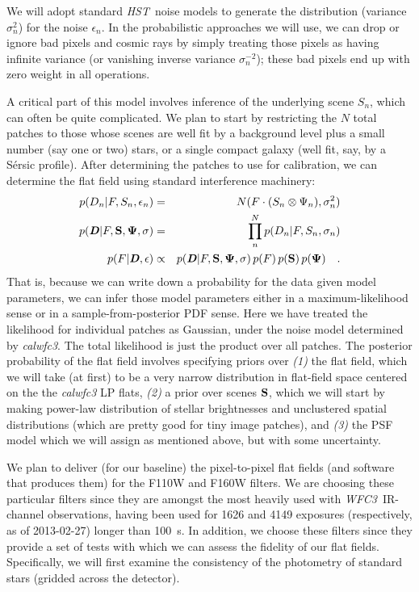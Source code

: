 \documentclass[12pt]{article}
\newcommand{\project}[1]{\textsl{#1}}
\newcommand{\HST}{\project{HST}}
\newcommand{\WFC}{\project{WFC3}}
\newcommand{\bvec}[1]{\textbf{\textit{#1}}}
\begin{document}
We will adopt standard \HST\ noise models to generate the distribution
(variance $\sigma_n^2$) for the noise $\epsilon_n$.  In the
probabilistic approaches we will use, we can drop or ignore bad pixels
and cosmic rays by simply treating those pixels as having infinite
variance (or vanishing inverse variance $\sigma_n^{-2}$); these bad
pixels end up with zero weight in all operations.

A critical part of this model involves inference of the underlying
scene $S_n$, which can often be quite complicated.  We plan to start by restricting the $N$ total patches to those whose
scenes are well fit by a background level plus a small number (say one or two) stars, or a single compact
galaxy (well fit, say, by a S\'{e}rsic profile).  After determining
the patches to use for calibration, we can determine the flat field
using standard interference machinery:
\begin{eqnarray}
p(D_n|F,S_n,\epsilon_n) &=& N(F \cdot (S_n \otimes \Psi_n), \sigma_n^2)
\\
p(\bvec{D}|F,{\bf S},{\bf \Psi},{\bf \sigma}) &=& \prod_n^N
p(D_n|F,S_n,\sigma_n) \\
p(F|\bvec{D},{\bf \epsilon}) & \propto & p(\bvec{D}|F,{\bf S},{\bf \Psi},{\bf
  \sigma})\, p(F)\, p({\bf S})\, p({\bf \Psi})
\quad .
\end{eqnarray}
That is, because we can write down a probability for the data given model
parameters, we can infer those model parameters either in a maximum-likelihood
sense or in a sample-from-posterior PDF sense.
Here we have treated the likelihood for individual patches as
Gaussian, under the noise model determined by \textsl{calwfc3}.  The
total likelihood is just the product over all patches.  The posterior
probability of the flat field involves specifying priors over
\textsl{(1)} the flat field, which we will take (at first) to be a
very narrow distribution in flat-field space centered on the the
\textsl{calwfc3} LP flats, \textsl{(2)} a prior over scenes ${\bf S}$,
which we will start by making power-law distribution of stellar
brightnesses and unclustered spatial distributions (which are pretty
good for tiny image patches), and \textsl{(3)} the PSF model which we
will assign as mentioned above, but with some uncertainty.

We plan to deliver (for our baseline) the pixel-to-pixel flat fields
(and software that produces them) for the F110W and F160W filters.  We
are choosing these particular filters since they are amongst the most
heavily used with \WFC\ IR-channel observations, having been used for
1626 and 4149 exposures (respectively, as of 2013-02-27) longer than
100~s.  In addition, we choose these filters since they provide a set
of tests with which we can assess the fidelity of our flat fields.
Specifically, we will first examine the consistency of the photometry
of standard stars (gridded across the detector).
\end{document}
